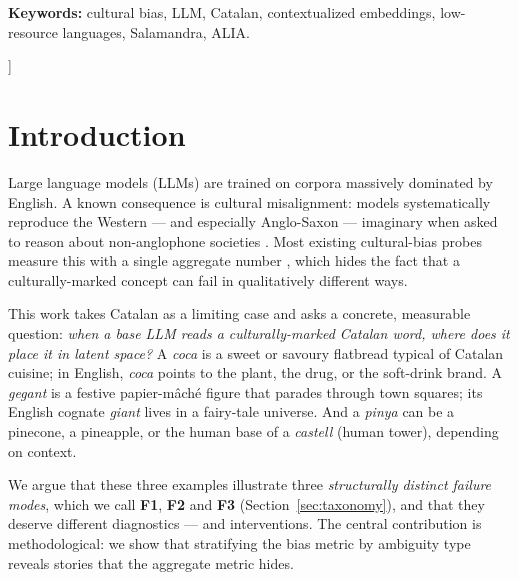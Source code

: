 \documentclass[10pt,twocolumn,a4paper]{article}
\newcommand{\concept}[1]{\emph{#1}}
\newcommand{\Fone}{\textbf{F1}}
\newcommand{\Ftwo}{\textbf{F2}}
\newcommand{\Fthree}{\textbf{F3}}
\begin{document}
{\begin{center}
\begin{minipage}{0.86\textwidth}
\medskip
\noindent\textbf{Keywords:} cultural bias, LLM, Catalan, contextualized
embeddings, low-resource languages, Salamandra, ALIA.
\end{minipage}
\end{center}
\vspace{1.0em}
}]

\section{Introduction}

Large language models (LLMs) are trained on corpora massively dominated by
English. A known consequence is cultural misalignment: models systematically
reproduce the Western --- and especially Anglo-Saxon --- imaginary when asked
to reason about non-anglophone societies \citep{tao2024,wang2023,adalovelace2025}.
Most existing cultural-bias probes measure this with a single aggregate number
\citep{naous2024,li2023}, which hides the fact that a culturally-marked concept
can fail in qualitatively different ways.

This work takes Catalan as a limiting case and asks a concrete, measurable
question: \emph{when a base LLM reads a culturally-marked Catalan word, where
does it place it in latent space?} A \concept{coca} is a sweet or savoury
flatbread typical of Catalan cuisine; in English, \emph{coca} points to the
plant, the drug, or the soft-drink brand. A \concept{gegant} is a festive
papier-mâché figure that parades through town squares; its English cognate
\emph{giant} lives in a fairy-tale universe. And a \concept{pinya} can be a
pinecone, a pineapple, or the human base of a \concept{castell} (human tower),
depending on context.

We argue that these three examples illustrate three \emph{structurally
distinct failure modes}, which we call \Fone{}, \Ftwo{} and \Fthree{}
(Section~\ref{sec:taxonomy}), and that they deserve different diagnostics ---
and interventions. The central contribution is methodological: we show that
stratifying the bias metric by ambiguity type reveals stories that the
aggregate metric hides.
\end{document}
